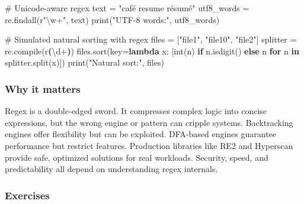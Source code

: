 \documentclass[
  letterpaper,
  DIV=11,
  numbers=noendperiod]{scrreprt}
\newenvironment{Shaded}{\begin{snugshade}}{\end{snugshade}}
\newcommand{\BuiltInTok}[1]{\textcolor[rgb]{0.00,0.23,0.31}{#1}}
\newcommand{\CommentTok}[1]{\textcolor[rgb]{0.37,0.37,0.37}{#1}}
\newcommand{\ControlFlowTok}[1]{\textcolor[rgb]{0.00,0.23,0.31}{\textbf{#1}}}
\newcommand{\DecValTok}[1]{\textcolor[rgb]{0.68,0.00,0.00}{#1}}
\newcommand{\KeywordTok}[1]{\textcolor[rgb]{0.00,0.23,0.31}{\textbf{#1}}}
\newcommand{\NormalTok}[1]{\textcolor[rgb]{0.00,0.23,0.31}{#1}}
\newcommand{\OperatorTok}[1]{\textcolor[rgb]{0.37,0.37,0.37}{#1}}
\newcommand{\StringTok}[1]{\textcolor[rgb]{0.13,0.47,0.30}{#1}}
\newcommand{\VerbatimStringTok}[1]{\textcolor[rgb]{0.13,0.47,0.30}{#1}}
\begin{document}
\begin{Shaded}
\begin{Highlighting}[]
\CommentTok{\# Unicode{-}aware regex}
\NormalTok{text }\OperatorTok{=} \StringTok{"café resume résumé"}
\NormalTok{utf8\_words }\OperatorTok{=}\NormalTok{ re.findall(}\VerbatimStringTok{r"}\DecValTok{\textbackslash{}w}\OperatorTok{+}\VerbatimStringTok{"}\NormalTok{, text)}
\BuiltInTok{print}\NormalTok{(}\StringTok{"UTF{-}8 words:"}\NormalTok{, utf8\_words)}

\CommentTok{\# Simulated natural sorting with regex}
\NormalTok{files }\OperatorTok{=}\NormalTok{ [}\StringTok{"file1"}\NormalTok{, }\StringTok{"file10"}\NormalTok{, }\StringTok{"file2"}\NormalTok{]}
\NormalTok{splitter }\OperatorTok{=}\NormalTok{ re.}\BuiltInTok{compile}\NormalTok{(}\VerbatimStringTok{r\textquotesingle{}}\KeywordTok{(}\DecValTok{\textbackslash{}d}\OperatorTok{+}\KeywordTok{)}\VerbatimStringTok{\textquotesingle{}}\NormalTok{)}
\NormalTok{files.sort(key}\OperatorTok{=}\KeywordTok{lambda}\NormalTok{ x: [}\BuiltInTok{int}\NormalTok{(n) }\ControlFlowTok{if}\NormalTok{ n.isdigit() }\ControlFlowTok{else}\NormalTok{ n }\ControlFlowTok{for}\NormalTok{ n }\KeywordTok{in}\NormalTok{ splitter.split(x)])}
\BuiltInTok{print}\NormalTok{(}\StringTok{"Natural sort:"}\NormalTok{, files)}
\end{Highlighting}
\end{Shaded}

\subsubsection{Why it matters}\label{why-it-matters-41}

Regex is a double-edged sword. It compresses complex logic into concise
expressions, but the wrong engine or pattern can cripple systems.
Backtracking engines offer flexibility but can be exploited. DFA-based
engines guarantee performance but restrict features. Production
libraries like RE2 and Hyperscan provide safe, optimized solutions for
real workloads. Security, speed, and predictability all depend on
understanding regex internals.

\subsubsection{Exercises}\label{exercises-40}
\end{document}
